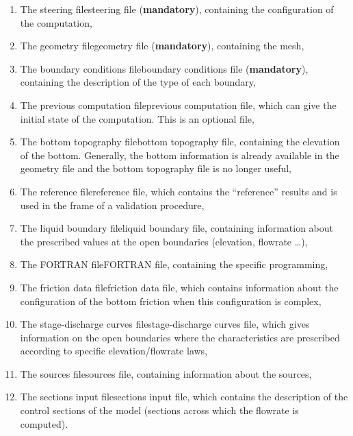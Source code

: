 \documentclass{article} %
\begin{document}
\begin{enumerate}
\item  The steering filesteering file (\textbf{mandatory}), containing the configuration of the computation,

\item  The geometry filegeometry file (\textbf{mandatory}), containing the mesh,

\item  The boundary conditions fileboundary conditions file (\textbf{mandatory}), containing the description of the type of each boundary,

\item  The previous computation fileprevious computation file, which can give the initial state of the computation. This is an optional file,

\item  The bottom topography filebottom topography file, containing the elevation of the bottom. Generally, the bottom information is already available in the geometry file and the bottom topography file is no longer useful,

\item  The reference filereference file, which contains the ``reference'' results and is used in the frame of a validation procedure,

\item  The liquid boundary fileliquid boundary file, containing information about the prescribed values at the open boundaries (elevation, flowrate {\dots}),

\item  The FORTRAN fileFORTRAN file, containing the specific programming,

\item  The friction data filefriction data file, which contains information about the configuration of the bottom friction when this configuration is complex,

\item  The stage-discharge curves filestage-discharge curves file, which gives information on the open boundaries where the characteristics are prescribed according to specific elevation/flowrate laws,

\item  The sources filesources file, containing information about the sources,

\item  The sections input filesections input file, which contains the description of the control sections of the model (sections across which the flowrate is computed).


\end{enumerate}
\end{document}
